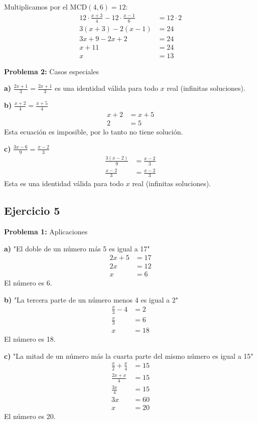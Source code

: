 Multiplicamos por el MCD$(4,6) = 12$:
\begin{align}
12 \cdot \frac{x+3}{4} - 12 \cdot \frac{x-1}{6} &= 12 \cdot 2\\
3(x+3) - 2(x-1) &= 24\\
3x + 9 - 2x + 2 &= 24\\
x + 11 &= 24\\
x &= 13
\end{align}

\textbf{Problema 2:} Casos especiales

\textbf{a)} $\frac{2x+1}{3} = \frac{2x+1}{3}$ es una identidad válida para todo $x$ real (infinitas soluciones).

\textbf{b)} $\frac{x+2}{4} = \frac{x+5}{4}$
\begin{align}
x + 2 &= x + 5\\
2 &= 5
\end{align}
Esta ecuación es imposible, por lo tanto no tiene solución.

\textbf{c)} $\frac{3x-6}{9} = \frac{x-2}{3}$
\begin{align}
\frac{3(x-2)}{9} &= \frac{x-2}{3}\\
\frac{x-2}{3} &= \frac{x-2}{3}
\end{align}
Esta es una identidad válida para todo $x$ real (infinitas soluciones).

\subsection*{Ejercicio 5}

\textbf{Problema 1:} Aplicaciones

\textbf{a)} "El doble de un número más 5 es igual a 17"
\begin{align}
2x + 5 &= 17\\
2x &= 12\\
x &= 6
\end{align}
El número es 6.

\textbf{b)} "La tercera parte de un número menos 4 es igual a 2"
\begin{align}
\frac{x}{3} - 4 &= 2\\
\frac{x}{3} &= 6\\
x &= 18
\end{align}
El número es 18.

\textbf{c)} "La mitad de un número más la cuarta parte del mismo número es igual a 15"
\begin{align}
\frac{x}{2} + \frac{x}{4} &= 15\\
\frac{2x + x}{4} &= 15\\
\frac{3x}{4} &= 15\\
3x &= 60\\
x &= 20
\end{align}
El número es 20.

